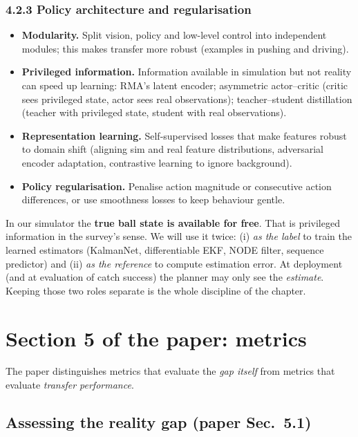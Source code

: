 \documentclass[11pt,a4paper]{article}
\begin{document}
\subsubsection*{4.2.3 Policy architecture and regularisation}
\begin{itemize}
\item \textbf{Modularity.} Split vision, policy and low-level control into independent modules; this
makes transfer more robust (examples in pushing and driving).
\item \textbf{Privileged information.} Information available in simulation but not reality can
speed up learning: RMA's latent encoder; asymmetric actor--critic (critic sees privileged state,
actor sees real observations); teacher--student distillation (teacher with privileged state,
student with real observations).
\item \textbf{Representation learning.} Self-supervised losses that make features robust to domain
shift (aligning sim and real feature distributions, adversarial encoder adaptation, contrastive
learning to ignore background).
\item \textbf{Policy regularisation.} Penalise action magnitude or consecutive action differences,
or use smoothness losses to keep behaviour gentle.
\end{itemize}

\begin{ours}
In our simulator the \textbf{true ball state is available for free}. That is privileged information
in the survey's sense. We will use it twice: (i) \emph{as the label} to train the learned
estimators (KalmanNet, differentiable EKF, NODE filter, sequence predictor) and (ii) \emph{as the
reference} to compute estimation error. At deployment (and at evaluation of catch success) the
planner may only see the \emph{estimate}. Keeping those two roles separate is the whole
discipline of the chapter.
\end{ours}

\section{Section 5 of the paper: metrics}

The paper distinguishes metrics that evaluate the \emph{gap itself} from metrics that evaluate
\emph{transfer performance}.

\subsection{Assessing the reality gap \textnormal{(paper Sec.~5.1)}}
\end{document}
